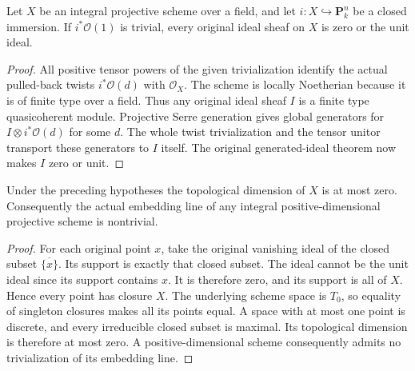 \begin{lemma}
\label{lem:fc-trivial-projective-twist-ideals}
\leanok
{}
Let $X$ be an integral projective scheme over a field, and let
$i:X\hookrightarrow\mathbf P^n_k$ be a closed immersion. If
$i^*\mathcal O(1)$ is trivial, every original ideal sheaf on $X$ is zero
or the unit ideal.
\end{lemma}
\begin{proof}
All positive tensor powers of the given trivialization identify the actual
pulled-back twists $i^*\mathcal O(d)$ with $\mathcal O_X$. The scheme is
locally Noetherian because it is of finite type over a field. Thus any
original ideal sheaf $I$ is a finite type quasicoherent module. Projective
Serre generation gives global generators for $I\otimes i^*\mathcal O(d)$
for some $d$. The whole twist trivialization and the tensor unitor
transport these generators to $I$ itself. The original generated-ideal
theorem now makes $I$ zero or unit.
\end{proof}

\begin{lemma}
\label{lem:fc-trivial-embedding-line-dimension-zero}
\leanok
{}
Under the preceding hypotheses the topological dimension of $X$ is at
most zero. Consequently the actual embedding line of any integral
positive-dimensional projective scheme is nontrivial.
\end{lemma}
\begin{proof}
For each original point $x$, take the original vanishing ideal of the
closed subset $\overline{\{x\}}$. Its support is exactly that closed
subset. The ideal cannot be the unit ideal since its support contains
$x$. It is therefore zero, and its support is all of $X$. Hence every
point has closure $X$. The underlying scheme space is $T_0$, so equality
of singleton closures makes all its points equal. A space with at most
one point is discrete, and every irreducible closed subset is maximal.
Its topological dimension is therefore at most zero. A positive-dimensional
scheme consequently admits no trivialization of its embedding line.
\end{proof}
